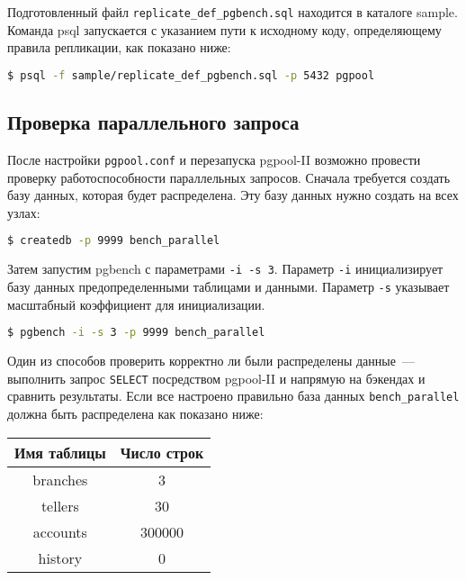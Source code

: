 Подготовленный файл \lstinline!replicate_def_pgbench.sql! находится в каталоге sample. Команда psql запускается с указанием пути к исходному коду, определяющему правила репликации, как показано ниже:

\begin{lstlisting}[language=Bash,label=lst:pgpool36,caption=Установка правил репликации]
$ psql -f sample/replicate_def_pgbench.sql -p 5432 pgpool
\end{lstlisting}

\subsection{Проверка параллельного запроса}

После настройки \lstinline!pgpool.conf! и перезапуска pgpool-II возможно провести проверку работоспособности параллельных запросов. Сначала требуется создать базу данных, которая будет распределена. Эту базу данных нужно создать на всех узлах:

\begin{lstlisting}[language=Bash,label=lst:pgpool37,caption=Проверка параллельного запроса]
$ createdb -p 9999 bench_parallel
\end{lstlisting}

Затем запустим pgbench с параметрами \lstinline!-i -s 3!. Параметр \lstinline!-i! инициализирует базу данных предопределенными таблицами и данными. Параметр \lstinline!-s! указывает масштабный коэффициент для инициализации.

\begin{lstlisting}[language=Bash,label=lst:pgpool38,caption=Проверка параллельного запроса]
$ pgbench -i -s 3 -p 9999 bench_parallel
\end{lstlisting}

Один из способов проверить корректно ли были распределены данные~--- выполнить запрос \lstinline!SELECT! посредством pgpool-II и напрямую на бэкендах и сравнить результаты. Если все настроено правильно база данных \lstinline!bench_parallel! должна быть распределена как показано ниже:

\begin{tabular}{ | c | c | }
  \hline
  Имя таблицы & Число строк \\
  \hline
  branches & 3 \\
  \hline
  tellers & 30 \\
  \hline
  accounts & 300000 \\
  \hline
  history & 0 \\
  \hline
\end{tabular}

